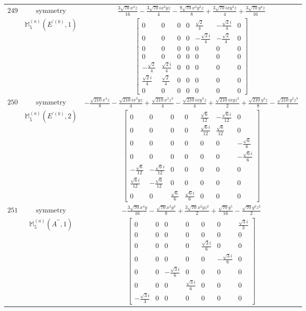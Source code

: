 \documentclass[fleqn,8pt,landscape]{jsarticle}
\begin{document}
\begin{longtable}{ccc}
$ 249 $ & $ \text{symmetry} $ & $ \frac{3 \sqrt{70} x^{4} z}{16} - \frac{3 \sqrt{70} i x^{3} y z}{4} - \frac{9 \sqrt{70} x^{2} y^{2} z}{8} + \frac{3 \sqrt{70} i x y^{3} z}{4} + \frac{3 \sqrt{70} y^{4} z}{16} $ \\
$  $ & $ \mathbb{M}_{5}^{(a)}(E^{\prime(b)},1) $ & $ \begin{bmatrix} 0 & 0 & 0 & 0 & \frac{\sqrt{2}}{4} & - \frac{\sqrt{2} i}{4} & 0 \\ 0 & 0 & 0 & 0 & - \frac{\sqrt{2} i}{4} & - \frac{\sqrt{2}}{4} & 0 \\ 0 & 0 & 0 & 0 & 0 & 0 & 0 \\ 0 & 0 & 0 & 0 & 0 & 0 & 0 \\ - \frac{\sqrt{2}}{4} & \frac{\sqrt{2} i}{4} & 0 & 0 & 0 & 0 & 0 \\ \frac{\sqrt{2} i}{4} & \frac{\sqrt{2}}{4} & 0 & 0 & 0 & 0 & 0 \\ 0 & 0 & 0 & 0 & 0 & 0 & 0 \end{bmatrix} $ \\ \hline
$ 250 $ & $ \text{symmetry} $ & $ - \frac{\sqrt{210} x^{4} z}{8} - \frac{\sqrt{210} i x^{3} y z}{4} + \frac{\sqrt{210} x^{2} z^{3}}{4} - \frac{\sqrt{210} i x y^{3} z}{4} + \frac{\sqrt{210} i x y z^{3}}{2} + \frac{\sqrt{210} y^{4} z}{8} - \frac{\sqrt{210} y^{2} z^{3}}{4} $ \\
$  $ & $ \mathbb{M}_{5}^{(a)}(E^{\prime(b)},2) $ & $ \begin{bmatrix} 0 & 0 & 0 & 0 & \frac{\sqrt{6}}{12} & - \frac{\sqrt{6} i}{12} & 0 \\ 0 & 0 & 0 & 0 & \frac{\sqrt{6} i}{12} & \frac{\sqrt{6}}{12} & 0 \\ 0 & 0 & 0 & 0 & 0 & 0 & - \frac{\sqrt{6}}{6} \\ 0 & 0 & 0 & 0 & 0 & 0 & - \frac{\sqrt{6} i}{6} \\ - \frac{\sqrt{6}}{12} & - \frac{\sqrt{6} i}{12} & 0 & 0 & 0 & 0 & 0 \\ \frac{\sqrt{6} i}{12} & - \frac{\sqrt{6}}{12} & 0 & 0 & 0 & 0 & 0 \\ 0 & 0 & \frac{\sqrt{6}}{6} & \frac{\sqrt{6} i}{6} & 0 & 0 & 0 \end{bmatrix} $ \\ \hline
$ 251 $ & $ \text{symmetry} $ & $ - \frac{3 \sqrt{70} x^{4} y}{16} - \frac{\sqrt{70} x^{2} y^{3}}{8} + \frac{3 \sqrt{70} x^{2} y z^{2}}{2} + \frac{\sqrt{70} y^{5}}{16} - \frac{\sqrt{70} y^{3} z^{2}}{2} $ \\
$  $ & $ \mathbb{M}_{5}^{(a)}(A^{\prime\prime},1) $ & $ \begin{bmatrix} 0 & 0 & 0 & 0 & 0 & 0 & \frac{\sqrt{3} i}{3} \\ 0 & 0 & 0 & 0 & 0 & 0 & 0 \\ 0 & 0 & 0 & 0 & \frac{\sqrt{3} i}{6} & 0 & 0 \\ 0 & 0 & 0 & 0 & 0 & - \frac{\sqrt{3} i}{6} & 0 \\ 0 & 0 & - \frac{\sqrt{3} i}{6} & 0 & 0 & 0 & 0 \\ 0 & 0 & 0 & \frac{\sqrt{3} i}{6} & 0 & 0 & 0 \\ - \frac{\sqrt{3} i}{3} & 0 & 0 & 0 & 0 & 0 & 0 \end{bmatrix} $ \\ \hline

\end{longtable}
\end{document}
